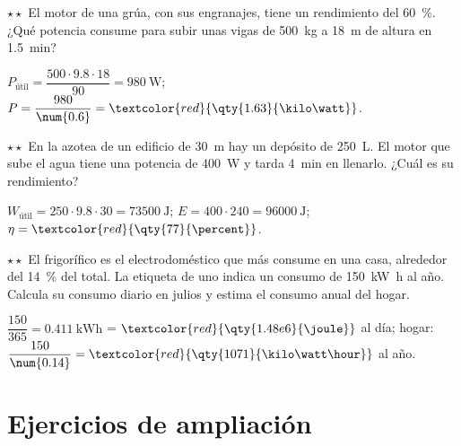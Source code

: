 \begin{exercise}
    \(\star\star\) El motor de una grúa, con sus engranajes, tiene un rendimiento del \qty{60}{\percent}. ¿Qué potencia consume para
    subir unas vigas de \qty{500}{\kg} a \qty{18}{\m} de altura en \qty{1.5}{\minute}?
    \begin{solu}
        \(P_{\text{útil}} = \dfrac{500 \cdot \num{9.8} \cdot 18}{90} = \qty{980}{\watt}\); \(P = \dfrac{980}{\num{0.6}} = \textcolor{red}{\qty{1.63}{\kilo\watt}}\).
    \end{solu}
\end{exercise}

\begin{exercise}
    \(\star\star\) En la azotea de un edificio de \qty{30}{\m} hay un depósito de \qty{250}{\liter}. El motor que sube el agua tiene una
    potencia de \qty{400}{\watt} y tarda \qty{4}{\minute} en llenarlo. ¿Cuál es su rendimiento?
    \begin{solu}
        \(W_{\text{útil}} = 250 \cdot \num{9.8} \cdot 30 = \qty{73500}{\joule}\); \(E = 400 \cdot 240 = \qty{96000}{\joule}\);
        \(\eta = \textcolor{red}{\qty{77}{\percent}}\).
    \end{solu}
\end{exercise}

\begin{exercise}
    \(\star\star\) El frigorífico es el electrodoméstico que más consume en una casa, alrededor del \qty{14}{\percent} del total. La
    etiqueta de uno indica un consumo de \qty{150}{\kilo\watt\hour} al año. Calcula su consumo diario en julios y estima el consumo
    anual del hogar.
    \begin{solu}
        \(\dfrac{150}{365} = \qty{0.411}{\kilo\watt\hour}\) = \(\textcolor{red}{\qty{1.48e6}{\joule}}\) al día; hogar:
        \(\dfrac{150}{\num{0.14}} = \textcolor{red}{\qty{1071}{\kilo\watt\hour}}\) al año.
    \end{solu}
\end{exercise}

\section{Ejercicios de ampliación}\label{sec:ud12-ampliacion}

